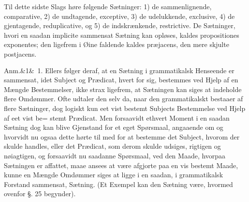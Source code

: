 \documentclass[12pt]{book}
\def\sperr#1{#1}%
\def\textit#1{#1}%
\newcommand{\sperr}[1]{\textls[180]{#1}}
\newcommand{\anm}[1]{%
  \par\vspace{0.5\baselineskip}%
  \noindent\hspace{\parindent}\sperr{Anm.}\ifx&#1&\else~\textit{#1}.\fi
  \enspace\ignorespaces
}
\newcommand{\opage}[1]{\marginnote{\footnotesize\textit{[#1]}}}
\begin{document}
Til dette sidste Slags høre følgende Sætninger: 1) de sammenlignende,
\textit{comparative}, 2) de undtagende, \textit{exceptive}, 3) de udelukkende,
\textit{exclusive}, 4) de gjentagende, \textit{reduplicative}, og 5) de
indskrænkende, \textit{restrictive}. De Sætninger, hvori en saadan
\textit{implicite} sammensat Sætning kan opløses, kaldes
\textit{propositiones exponentes}; den ligefrem i Øine faldende kaldes
\textit{præjacens}, den mere skjulte \textit{postjacens}.

\anm{1} Ellers følger deraf, at en Sætning i grammatikalsk Henseende er
sammensat, idet Subject og Prædicat, hvert for sig, bestemmes ved Hjelp af en
Mængde Bestemmelser, ikke strax ligefrem, at Sætningen kan siges at indeholde
flere Omdømmer. Ofte udtaler den selv da, naar den grammatikalskt bestaaer af
flere Sætninger, dog logiskt kun eet vist bestemt Subjects Bestemmelse ved
Hjelp af eet vist be=%
\opage{295} stemt Prædicat. Men forsaavidt ethvert Moment i en saadan Sætning dog kan blive
Gjenstand for et eget Spørsmaal, angaaende om og hvorvidt nu ogsaa dette hørte
til med for at bestemme det Subject, hvorom der skulde handles, eller det
Prædicat, som derom skulde udsiges, rigtigen og nøiagtigen, og forsaavidt nu
saadanne Spørsmaal, ved den Maade, hvorpaa Sætningen er affattet, maae ansees
at være afgjorte paa en vis bestemt Maade, kunne en Mængde Omdømmer siges at
ligge i en saadan, i grammatikalsk Forstand sammensat, Sætning. (Et Exempel kan
den Sætning være, hvormed ovenfor §. 25 begynder).
\end{document}
